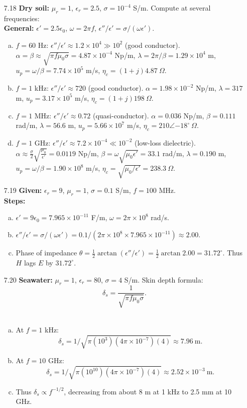 \begin{enumerate}
\item[7.18] \textbf{Dry soil:} $\mu_r=1$, $\epsilon_r=2.5$, $\sigma=10^{-4}$ S/m.  Compute at several frequencies:
\\
\textbf{General:} $\epsilon'=2.5\epsilon_0$, $\omega=2\pi f$, $\epsilon''/\epsilon'=\sigma/(\omega\epsilon')$.
\\
\begin{enumerate}[(a)]
  \item $f=60$ Hz: $\epsilon''/\epsilon'\approx1.2\times10^4\gg10^2$ (good conductor).  
    $\alpha=\beta\approx\sqrt{\pi f\mu_0\sigma}=4.87\times10^{-4}$ Np/m,
    $\lambda=2\pi/\beta=1.29\times10^4$ m,
    $u_p=\omega/\beta=7.74\times10^5$ m/s,
    $\eta_c=(1+j)4.87\ \Omega$.
  \item $f=1$ kHz: $\epsilon''/\epsilon'\approx720$ (good conductor).  
    $\alpha=1.98\times10^{-2}$ Np/m,
    $\lambda=317$ m,
    $u_p=3.17\times10^5$ m/s,
    $\eta_c=(1+j)198\ \Omega$.
  \item $f=1$ MHz: $\epsilon''/\epsilon'\approx0.72$ (quasi-conductor).  
    $\alpha=0.036$ Np/m,
    $\beta=0.111$ rad/m,
    $\lambda=56.6$ m,
    $u_p=5.66\times10^7$ m/s,
    $\eta_c=210\angle{-18^\circ}\ \Omega$.
  \item $f=1$ GHz: $\epsilon''/\epsilon'\approx7.2\times10^{-4}\ll10^{-2}$ (low-loss dielectric).  
    $\alpha\approx\tfrac{\sigma}{2}\sqrt{\tfrac{\mu_0}{\epsilon'}}=0.0119$ Np/m,
    $\beta=\omega\sqrt{\mu_0\epsilon'}=33.1$ rad/m,
    $\lambda=0.190$ m,
    $u_p=\omega/\beta=1.90\times10^8$ m/s,
    $\eta_c=\sqrt{\mu_0/\epsilon'}=238.3\ \Omega$.
\end{enumerate}

\item[7.19] \textbf{Given:} $\epsilon_r=9$, $\mu_r=1$, $\sigma=0.1$ S/m, $f=100$ MHz.
\\
\textbf{Steps:}
\begin{enumerate}[(a)]
  \item $\epsilon'=9\epsilon_0=7.965\times10^{-11}$ F/m, $\omega=2\pi\times10^8$ rad/s.
  \item $\epsilon''/\epsilon'=\sigma/(\omega\epsilon')=0.1/(2\pi\times10^8\times7.965\times10^{-11})\approx2.00$.
  \item Phase of impedance $\theta=\tfrac12\arctan(\epsilon''/\epsilon')=\tfrac12\arctan2.00=31.72^\circ$.  Thus $H$ lags $E$ by $31.72^\circ$.
\end{enumerate}

\item[7.20] \textbf{Seawater:} $\mu_r=1$, $\epsilon_r=80$, $\sigma=4$ S/m.  Skin depth formula:
\[\delta_s=\frac{1}{\sqrt{\pi f \mu_0 \sigma}}.\]
\\
\begin{enumerate}[(a)]
  \item At $f=1$ kHz:  
    \[\delta_s=1/\sqrt{\pi(10^3)(4\pi\times10^{-7})(4)}\approx7.96~\mathrm m.\]
  \item At $f=10$ GHz:
    \[\delta_s=1/\sqrt{\pi(10^{10})(4\pi\times10^{-7})(4)}\approx2.52\times10^{-3}~\mathrm m.\]
  \item Thus $\delta_s\propto f^{-1/2}$, decreasing from about 8 m at 1 kHz to 2.5 mm at 10 GHz.
\end{enumerate}


\end{enumerate}
